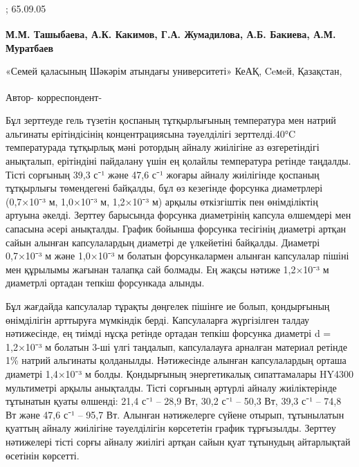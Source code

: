 ; 65.09.05

\begin{articleheader}

{\bfseries
М.М. Ташыбаева\textsuperscript{\envelope },
А.К. Какимов,
Г.А. Жумадилова,
А.Б. Бакиева,
А.М. Муратбаев
}
\end{articleheader}

\begin{affiliation}
«Семей қаласының Шәкәрім атындағы университеті» КеАҚ, Ceмeй, Қазақстан,

\raggedright \textsuperscript{\envelope } Автор- корреспондент-
\href{mailto:marzhan06081990@gmail.com}{}
\end{affiliation}

Бұл зерттеуде гель түзетін қоспаның тұтқырлығының температура мен натрий
альгинаты ерітіндісінің концентрациясына тәуелділігі зерттелді.40°C
температурада тұтқырлық мәні ротордың айналу жиілігіне аз өзгеретіндігі
анықталып, ерітіндіні пайдалану үшін ең қолайлы температура ретінде
таңдалды. Тісті сорғының 39,3 с⁻¹ және 47,6 с⁻¹ жоғары айналу жиілігінде
қоспаның тұтқырлығы төмендегені байқалды, бұл өз кезегінде форсунка
диаметрлері (0,7×10⁻³ м, 1,0×10⁻³ м, 1,2×10⁻³ м) арқылы өткізгіштік пен
өнімділіктің артуына әкелді. Зерттеу барысында форсунка диаметрінің
капсула өлшемдері мен сапасына әсері анықталды. График бойынша форсунка
тесігінің диаметрі артқан сайын алынған капсулалардың диаметрі де
үлкейетіні байқалды. Диаметрі 0,7×10⁻³ м және 1,0×10⁻³ м болатын
форсункалармен алынған капсулалар пішіні мен құрылымы жағынан талапқа
сай болмады. Ең жақсы нәтиже 1,2×10⁻³ м диаметрлі ортадан тепкіш
форсункада алынды.

Бұл жағдайда капсулалар тұрақты дөңгелек пішінге ие болып, қондырғының
өнімділігін арттыруға мүмкіндік берді. Капсулаларға жүргізілген талдау
нәтижесінде, ең тиімді нұсқа ретінде ортадан тепкіш форсунка диаметрі d
= 1,2×10⁻³ м болатын 3-ші үлгі таңдалып, капсулалауға арналған материал
ретінде 1\% натрий альгинаты қолданылды. Нәтижесінде алынған
капсулалардың орташа диаметрі 1,4×10⁻³ м болды. Қондырғының
энергетикалық сипаттамалары HY4300 мультиметрі арқылы анықталды. Тісті
сорғының әртүрлі айналу жиіліктерінде тұтынатын қуаты өлшенді: 21,4 с⁻¹
-- 28,9 Вт, 30,2 с⁻¹ -- 50,3 Вт, 39,3 с⁻¹ -- 74,8 Вт және 47,6 с⁻¹ --
95,7 Вт. Алынған нәтижелерге сүйене отырып, тұтынылатын қуаттың айналу
жиілігіне тәуелділігін көрсететін график тұрғызылды. Зерттеу нәтижелері
тісті сорғы айналу жиілігі артқан сайын қуат тұтынудың айтарлықтай
өсетінін көрсетті.

